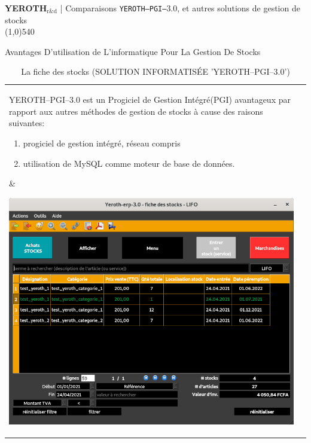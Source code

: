\documentclass[12pt, a4paper]{article}
\newcommand{\logicielpgi}{Progiciel de Gestion Intégré\xspace}
\newcommand{\yerothrd}{\textcolor{yerothColorGreen}
			{\textsc{\textcolor{yerothColorRed}{YEROTH}}$_{\text{r\&d}}$\xspace}}
\newcommand{\yerothpgiblack}{\texttt{YEROTH--PGI--$3.0$}\xspace}
\newcommand{\yerothpgi}{\textcolor{yerothColorBlue}{\sc YEROTH--PGI--$3.0$}\xspace}
\newcommand{\mysql}{MySQL\xspace}
\begin{document}
{\bf \Large \yerothrd} {| \sc \scriptsize Comparaisons \yerothpgiblack, et autres solutions de gestion de stocks}			
\\ \line(1,0){540}

\vspace{1.15em}


\parbox{27em}{\Large Avantages D'utilisation de L'informatique Pour
					La Gestion De Stocks}

\vspace{3.3em}

\begin{table}[!htbp]
\begin{tabular}{ll}
\parbox{27em}{
\yerothpgi est un \logicielpgi (PGI) avantageux par rapport
aux autres méthodes de gestion de stocks à cause des raisons suivantes:

\begin{enumerate}[1.]
	\itemsep -0.1em
	\item progiciel de gestion intégré, réseau compris
	\item utilisation de \mysql comme moteur de base de données. \\
\end{enumerate}
}

&

\parbox{15em}{
\begin{center}
\includegraphics[scale=0.25]{images/yeroth-fenetre-stocks.png}
\caption*{La fiche des stocks (SOLUTION INFORMATISÉE 'YEROTH--PGI--3.0')}
\end{center}
}
\end{tabular}
\end{table}
\end{document}
